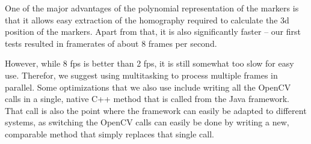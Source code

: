 One of the major advantages of the polynomial representation of the markers is that it allows easy extraction of the homography required to calculate the 3d position of the markers.
Apart from that, it is also significantly faster – our first tests resulted in framerates of about 8 frames per second.

However, while 8 fps is better than 2 fps, it is still somewhat too slow for easy use.
Therefor, we suggest using multitasking to process multiple frames in parallel.
Some optimizations that we also use include writing all the OpenCV calls in a single, native C++ method that is called from the Java framework.
That call is also the point where the framework can easily be adapted to different systems, as switching the OpenCV calls can easily be done by writing a new, comparable method that simply replaces that single call.
